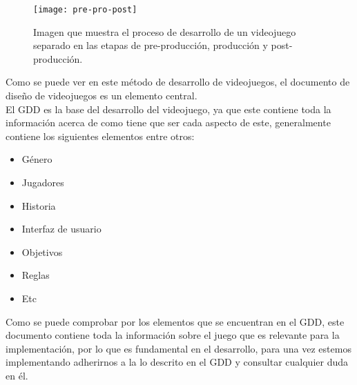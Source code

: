 \begin{figure}[h]
  \centering
  \texttt{[image: pre-pro-post]}
  \caption{Imagen que muestra el proceso de desarrollo de un videojuego separado en las etapas de pre-producción, producción y post-producción.\protect\footnotemark}
  \label{figura-pre-pro-post}
\end{figure}


\newpage

Como se puede ver en este método de desarrollo de videojuegos, el documento de diseño de videojuegos es un elemento central.\\

El GDD es la base del desarrollo del videojuego, ya que este contiene toda la información acerca de como tiene que ser cada aspecto de este, generalmente contiene los siguientes elementos entre otros:

\begin{itemize}
  \item Género
  \item Jugadores
  \item Historia
  \item Interfaz de usuario
  \item Objetivos
  \item Reglas
  \item Etc
\end{itemize}

Como se puede comprobar por los elementos que se encuentran en el GDD, este documento contiene toda la información sobre el juego que es relevante para la implementación, por lo que es fundamental en el desarrollo, para una vez estemos implementando adherirnos a la lo descrito en el GDD y consultar cualquier duda en él.
